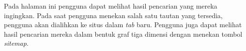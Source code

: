 \begin{enumerate}[label=\alph*)., leftmargin=1\parindent]
	Pada halaman ini pengguna dapat melihat hasil pencarian yang mereka ingingkan. Pada saat pengguna menekan salah satu tautan yang tersedia, pengguna akan dialihkan ke situs dalam \textit{tab} baru. Pengguna juga dapat melihat hasil pencarian mereka dalam bentuk graf tiga dimensi dengan menekan tombol \textit{sitemap}.

\end{enumerate}

%
%
%
%
%
%
%
%
%
